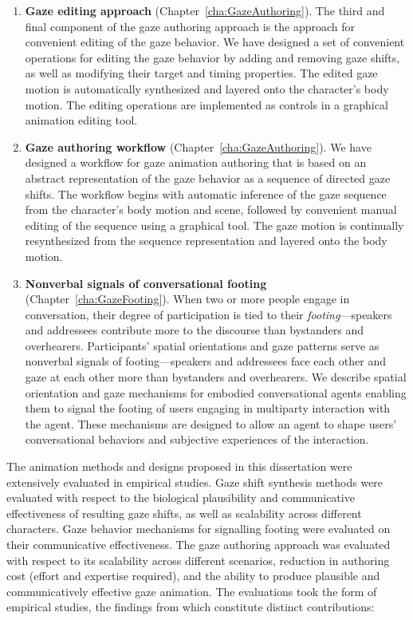 \begin{enumerate}
\item \textbf{Gaze editing approach} (Chapter~\ref{cha:GazeAuthoring}). The third and final component of the gaze authoring approach is the approach for convenient editing of the gaze behavior. We have designed a set of convenient operations for editing the gaze behavior by adding and removing gaze shifts, as well as modifying their target and timing properties. The edited gaze motion is automatically synthesized and layered onto the character's body motion. The editing operations are implemented as controls in a graphical animation editing tool.
\item \textbf{Gaze authoring workflow} (Chapter~\ref{cha:GazeAuthoring}). We have designed a workflow for gaze animation authoring that is based on an abstract representation of the gaze behavior as a sequence of directed gaze shifts. The workflow begins with automatic inference of the gaze sequence from the character's body motion and scene, followed by convenient manual editing of the sequence using a graphical tool. The gaze motion is continually resynthesized from the sequence representation and layered onto the body motion.
\item \textbf{Nonverbal signals of conversational footing} (Chapter~\ref{cha:GazeFooting}). When two or more people engage in conversation, their degree of participation is tied to their \emph{footing}---speakers and addressees contribute more to the discourse than bystanders and overhearers. Participants' spatial orientations and gaze patterns serve as nonverbal signals of footing---speakers and addressees face each other and gaze at each other more than bystanders and overhearers. We describe spatial orientation and gaze mechanisms for embodied conversational agents enabling them to signal the footing of users engaging in multiparty interaction with the agent. These mechanisms are designed to allow an agent to shape users' conversational behaviors and subjective experiences of the interaction.
\end{enumerate}

The animation methods and designs proposed in this dissertation were extensively evaluated in empirical studies. Gaze shift synthesis methods were evaluated with respect to the biological plausibility and communicative effectiveness of resulting gaze shifts, as well as scalability across different characters. Gaze behavior mechanisms for signalling footing were evaluated on their communicative effectiveness. The gaze authoring approach was evaluated with respect to its scalability across different scenarios, reduction in authoring cost (effort and expertise required), and the ability to produce plausible and communicatively effective gaze animation. The evaluations took the form of empirical studies, the findings from which constitute distinct contributions:

